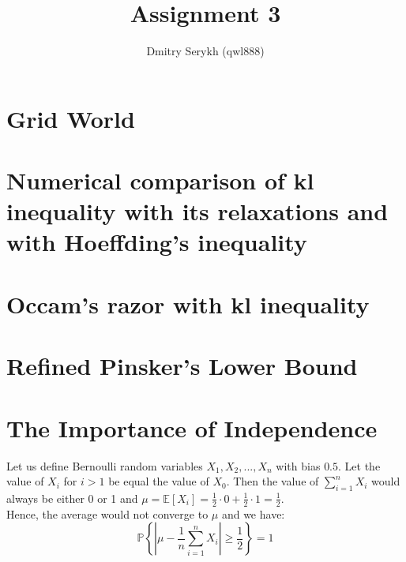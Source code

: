 \documentclass[a4paper]{article}
\title{\vspace{-5cm} Assignment 3}
\author{Dmitry Serykh (qwl888)}
\begin{document}
\maketitle

\section{Grid World}
\section{Numerical comparison of kl inequality with its relaxations and with Hoeffding’s inequality}
\section{Occam’s razor with kl inequality}
\section{Refined Pinsker’s Lower Bound}


\section{The Importance of Independence}
Let us define Bernoulli random variables $X_1, X_2, ..., X_n$ with bias $0.5$.
Let the value of $X_i$ for $i>1$ be equal the value of $X_0$. Then the value of
$\sum_{i=1}^{n} X_{i}$ would always be either 0 or 1 and
$\mu = \mathbb{E}\left[X_{i}\right] = \frac{1}{2} \cdot 0 + \frac{1}{2} \cdot 1 = \frac{1}{2}$.\\
Hence, the average would not converge to $\mu$ and we have:
$$
\mathbb{P}\left\{\left|\mu-\frac{1}{n} \sum_{i=1}^{n} X_{i}\right| \geq \frac{1}{2}\right\}=1
$$
\end{document}
